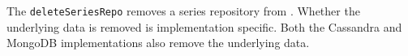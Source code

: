 The \verb+deleteSeriesRepo+ removes a series repository from \Rapture. Whether the underlying
data is removed is implementation specific. Both the Cassandra and MongoDB implementations
also remove the underlying data.
